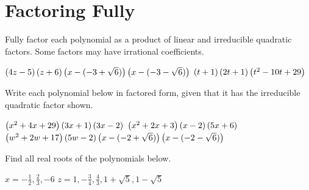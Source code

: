 \section*{Factoring Fully}
Fully factor each polynomial as a product of linear and irreducible quadratic factors. Some factors may have irrational coefficients.
\begin{smenum}
\mitemx
{$\left(4z-5\right)\left(z+6\right)\left(x-(-3+\sqrt{6})\right)\left(x-(-3-\sqrt{6})\right)$}
\mitemx
{$\left(t+1\right)\left(2t+1\right)\left(t^2-10t+29\right)$}
\end{smenum}
Write each polynomial below in factored form, given that it has the irreducible quadratic factor shown.
\begin{smenum}
\mitemxx
{$\left(x^2+4x+29\right)\left(3x+1\right)\left(3x-2\right)$}
{$\left(x^2+2x+3\right)\left(x-2\right)\left(5x+6\right)$}
\mitemx
{$\left(w^2+2w+17\right)\left(5w-2\right)\left(x-(-2+\sqrt{6})\right)\left(x-(-2-\sqrt{6})\right)$}
\end{smenum}
Find all real roots of the polynomials below.
\begin{smenum}
\mitemxx
{$x=-\frac{1}{2},\frac{2}{3},-6$}
{$z=1,-\frac{3}{4},\frac{4}{3},1+\sqrt{5},1-\sqrt{5}$}
\end{smenum}

